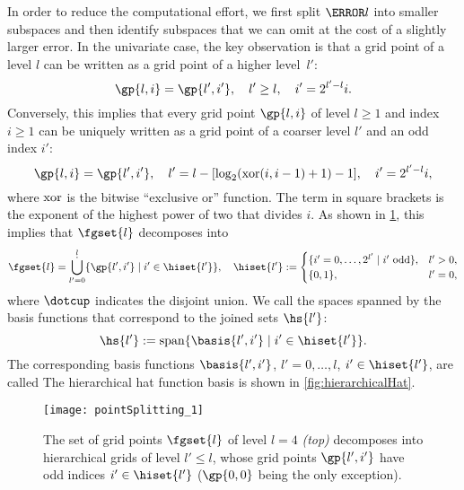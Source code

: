 In order to reduce the computational effort,
we first split $\ns{\*l}$ into smaller subspaces and then identify
subspaces that we can omit at the cost of a slightly larger error.
In the univariate case, the key observation is that a grid point of a level $l$
can be written as a grid point of a higher level~$l'$:
\begin{equation}
  \label{eq:rewriteGridPoint}
  \gp{l,i} = \gp{l',i'},\quad
  l' \ge l,\quad
  i' = 2^{l'-l} i.
\end{equation}
Conversely, this implies that every grid point $\gp{l,i}$ of level $l \ge 1$
and index $i \ge 1$ can be uniquely written
as a grid point of a coarser level $l'$ and an odd index $i'$:
\begin{equation}
  \gp{l,i} = \gp{l',i'},\quad
  l' = l - \bracket*{\log_2(\xor(i, i-1) + 1) - 1},\quad
  i' = 2^{l'-l} i,
\end{equation}
where $\operatorname{xor}$ is the bitwise ``exclusive or'' function.
The term in square brackets is the exponent of the
highest power of two that divides $i$.
As shown in \cref{fig:pointSplittingUniform},
this implies that $\fgset{l}$ decomposes into
\begin{equation}
  \fgset{l}
  = \bigdotcup_{l'=0}^l \{\gp{l',i'} \mid i' \in \hiset{l'}\},\quad
  \hiset{l'} :=
  \begin{cases}
    \{i' = 0, \dotsc, 2^{l'} \mid \text{$i'$ odd}\},&l' > 0,\\
    \{0, 1\},&l' = 0,
  \end{cases}
\end{equation}
where $\dotcup$ indicates the disjoint union.
We call the spaces spanned by the basis functions that correspond to the
joined sets  $\hs{l'}$:
\begin{equation}
  \hs{l'}
  := \spn\{\basis{l',i'} \mid i' \in \hiset{l'}\}.
\end{equation}
The corresponding basis functions
$\basis{l',i'}$, $l' = 0, \dotsc, l$, $i' \in \hiset{l'}$,
are called 
The hierarchical hat function basis is shown in \cref{fig:hierarchicalHat}.

\begin{SCfigure}
  \texttt{[image: pointSplitting\_1]}%
  \caption[%
    Decomposition of the set of univariate grid points%
  ]{%
    The set of grid points $\fgset{l}$ of level $l = 4$ \emph{(top)}
    decomposes into hierarchical grids of level $l' \le l$,
    whose grid points $\gp{l',i'}$ have odd indices $i' \in \hiset{l'}$
    ($\gp{0,0}$ being the only exception).%
  }%
  \label{fig:pointSplittingUniform}%
\end{SCfigure}

